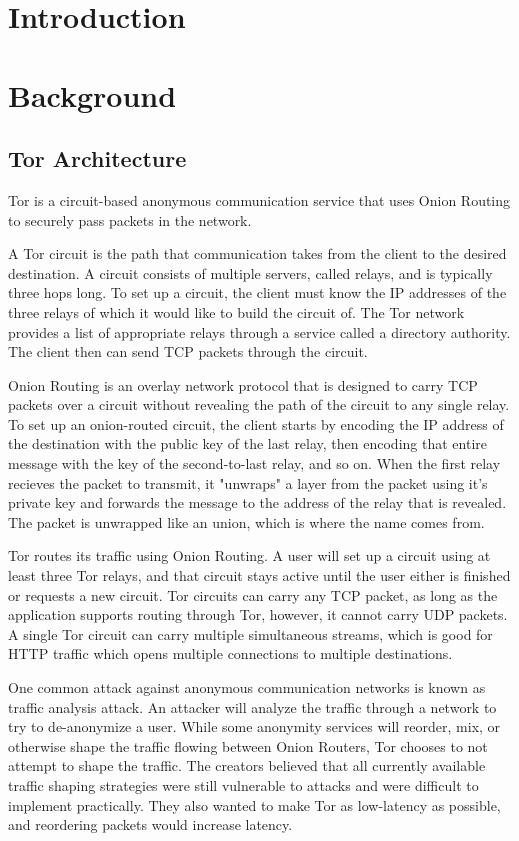 \documentclass[12pt,journal]{IEEEtran}
\providecommand{\keywords}[1]{\textbf{Keywords} #1}
\begin{document}

\section{Introduction}
\section{Background}
\subsection{Tor Architecture}
Tor is a circuit-based anonymous communication service that uses Onion Routing to securely pass packets in the network.
\par
A Tor circuit is the path that communication takes from the client to the desired destination. A circuit consists of multiple servers, called relays, and is typically three hops long. To set up a circuit, the client must know the IP addresses of the three relays of which it would like to build the circuit of. The Tor network provides a list of appropriate relays through a service called a directory authority. The client then can send TCP packets through the circuit.
\par
Onion Routing is an overlay network protocol that is designed to carry TCP packets over a circuit without revealing the path of the circuit to any single relay. To set up an onion-routed circuit, the client starts by encoding the IP address of the destination with the public key of the last relay, then encoding that entire message with the key of the second-to-last relay, and so on. When the first relay recieves the packet to transmit, it "unwraps" a layer from the packet using it's private key and forwards the message to the address of the relay that is revealed. The packet is unwrapped like an union, which is where the name comes from.
\par
Tor routes its traffic using Onion Routing. A user will set up a circuit using at least three Tor relays, and that circuit stays active until the user either is finished or requests a new circuit. Tor circuits can carry any TCP packet, as long as the application supports routing through Tor, however, it cannot carry UDP packets. A single Tor circuit can carry multiple simultaneous streams, which is good for HTTP traffic which opens multiple connections to multiple destinations.
\par
One common attack against anonymous communication networks is known as traffic analysis attack. An attacker will analyze the traffic through a network to try to de-anonymize a user. While some anonymity services will reorder, mix, or otherwise shape the traffic flowing between Onion Routers, Tor chooses to not attempt to shape the traffic. The creators believed that all currently available traffic shaping strategies were still vulnerable to attacks and were difficult to implement practically. They also wanted to make Tor as low-latency as possible, and reordering packets would increase latency.
\end{document}
